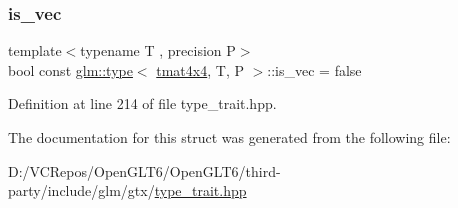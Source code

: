 \subsubsection{\texorpdfstring{is\_vec}{is\_vec}}
{\footnotesize\ttfamily template$<$typename T , precision P$>$ \\
bool const \mbox{\hyperlink{structglm_1_1type}{glm\+::type}}$<$ \mbox{\hyperlink{structglm_1_1tmat4x4}{tmat4x4}}, T, P $>$\+::is\+\_\+vec = false\hspace{0.3cm}{\ttfamily [static]}}



Definition at line 214 of file type\+\_\+trait.\+hpp.



The documentation for this struct was generated from the following file\+:\begin{DoxyCompactItemize}
\item 
D\+:/\+V\+C\+Repos/\+Open\+G\+L\+T6/\+Open\+G\+L\+T6/third-\/party/include/glm/gtx/\mbox{\hyperlink{type__trait_8hpp}{type\+\_\+trait.\+hpp}}\end{DoxyCompactItemize}

